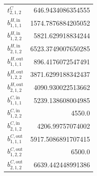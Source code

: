 \documentclass{article}%
\begin{document}
\begin{multicols*}{3}
\begin{supertabular}{lr}
	$t_{2,1,2}^{C}$ & 646.9434086354555 \\%
	$b_{1,1,1}^{H,\text{in}}$ & 1574.7876884205052 \\%
	$b_{1,2,2}^{H,\text{in}}$ & 5821.629918834244 \\%
	$b_{2,1,2}^{H,\text{in}}$ & 6523.3749007650285 \\%
	$b_{1,1,1}^{H,\text{out}}$ & 896.4176072547491 \\%
	$b_{1,2,2}^{H,\text{out}}$ & 3871.6299188342437 \\%
	$b_{2,1,2}^{H,\text{out}}$ & 4090.930022513662 \\%
	$b_{1,1,1}^{C,\text{in}}$ & 5239.138608004985 \\%
	$b_{1,2,2}^{C,\text{in}}$ & 4550.0 \\%
	$b_{2,1,2}^{C,\text{in}}$ & 4206.99757074002 \\%
	$b_{1,1,1}^{C,\text{out}}$ & 5917.5086891707415 \\%
	$b_{1,2,2}^{C,\text{out}}$ & 6500.0 \\%
	$b_{2,1,2}^{C,\text{out}}$ & 6639.442448991386 \\%
\end{supertabular}%
\end{multicols*}%
\clearpage%
\end{document}
